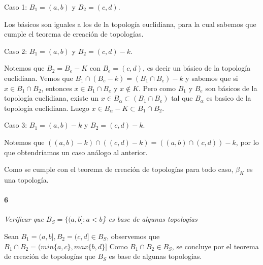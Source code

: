 \documentclass[12pt]{article}
\begin{document}
Caso 1: $B_1=(a,b)$ y $B_2=(c,d)$.

Los básicos son iguales a los de la topología euclidiana, para la cual sabemos que cumple el teorema de creación de topologías.
\vspace{0.15cm}

Caso 2: $B_1=(a,b)$ y  $B_2=(c,d)-k$.

Notemos que $B_2=B_e-K$ con $B_e=(c,d)$, es decir un básico de la topología euclidiana.
Vemos que \(B_1\cap(B_e-k)=(B_1\cap B_e)-k\) y sabemos que si \(x\in B_1 \cap B_2\), entonces \(x\in B_1 \cap B_e\) y $x\notin K$. 
Pero como \(B_1\) y \(B_e\) son básicos de la topología euclidiana, existe un \(x\in B_{\alpha} \subset (B_1\cap B_e)\) tal que \(B_{\alpha}\) es basico de la topología euclidiana.
Luego $x \in B_\alpha -K \subset B_1 \cap B_2$.
\vspace{0.15cm}

Caso 3: $B_1=(a,b)-k$ y $B_2=(c,d)-k$.

Notemos que \(((a,b)-k)\cap((c,d)-k)=((a,b)\cap(c,d))-k\), por lo que obtendríamos un caso análogo al anterior. 

Como se cumple con el teorema de creación de topologías para todo caso,  $\beta_K$ es una topología.
\paragraph{6}
\textit{Verificar que $B_S=\{(a,b]:a<b$\} es base de algunas topologias}

Sean $B_1=(a,b], B_2=(c,d] \in B_S$, observemos que $B_1 \cap B_2 = (min\{a,c\},max\{b,d\}]$
Como $B_1 \cap B_2 \in B_S$, se concluye por el teorema de creación de topologías que $B_S$ es base de algunas topologias.
\end{document}
